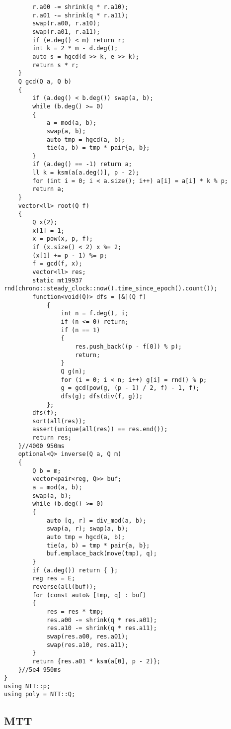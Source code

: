 \documentclass[12pt]{ctexart}
\begin{document}
\begin{lstlisting}
		r.a00 -= shrink(q * r.a10);
		r.a01 -= shrink(q * r.a11);
		swap(r.a00, r.a10);
		swap(r.a01, r.a11);
		if (e.deg() < m) return r;
		int k = 2 * m - d.deg();
		auto s = hgcd(d >> k, e >> k);
		return s * r;
	}
	Q gcd(Q a, Q b)
	{
		if (a.deg() < b.deg()) swap(a, b);
		while (b.deg() >= 0)
		{
			a = mod(a, b);
			swap(a, b);
			auto tmp = hgcd(a, b);
			tie(a, b) = tmp * pair{a, b};
		}
		if (a.deg() == -1) return a;
		ll k = ksm(a[a.deg()], p - 2);
		for (int i = 0; i < a.size(); i++) a[i] = a[i] * k % p;
		return a;
	}
	vector<ll> root(Q f)
	{
		Q x(2);
		x[1] = 1;
		x = pow(x, p, f);
		if (x.size() < 2) x %= 2;
		(x[1] += p - 1) %= p;
		f = gcd(f, x);
		vector<ll> res;
		static mt19937 rnd(chrono::steady_clock::now().time_since_epoch().count());
		function<void(Q)> dfs = [&](Q f)
			{
				int n = f.deg(), i;
				if (n <= 0) return;
				if (n == 1)
				{
					res.push_back((p - f[0]) % p);
					return;
				}
				Q g(n);
				for (i = 0; i < n; i++) g[i] = rnd() % p;
				g = gcd(pow(g, (p - 1) / 2, f) - 1, f);
				dfs(g); dfs(div(f, g));
			};
		dfs(f);
		sort(all(res));
		assert(unique(all(res)) == res.end());
		return res;
	}//4000 950ms
	optional<Q> inverse(Q a, Q m)
	{
		Q b = m;
		vector<pair<reg, Q>> buf;
		a = mod(a, b);
		swap(a, b);
		while (b.deg() >= 0)
		{
			auto [q, r] = div_mod(a, b);
			swap(a, r); swap(a, b);
			auto tmp = hgcd(a, b);
			tie(a, b) = tmp * pair{a, b};
			buf.emplace_back(move(tmp), q);
		}
		if (a.deg()) return { };
		reg res = E;
		reverse(all(buf));
		for (const auto& [tmp, q] : buf)
		{
			res = res * tmp;
			res.a00 -= shrink(q * res.a01);
			res.a10 -= shrink(q * res.a11);
			swap(res.a00, res.a01);
			swap(res.a10, res.a11);
		}
		return {res.a01 * ksm(a[0], p - 2)};
	}//5e4 950ms
}
using NTT::p;
using poly = NTT::Q;
\end{lstlisting}


\subsection{MTT}
\end{document}
